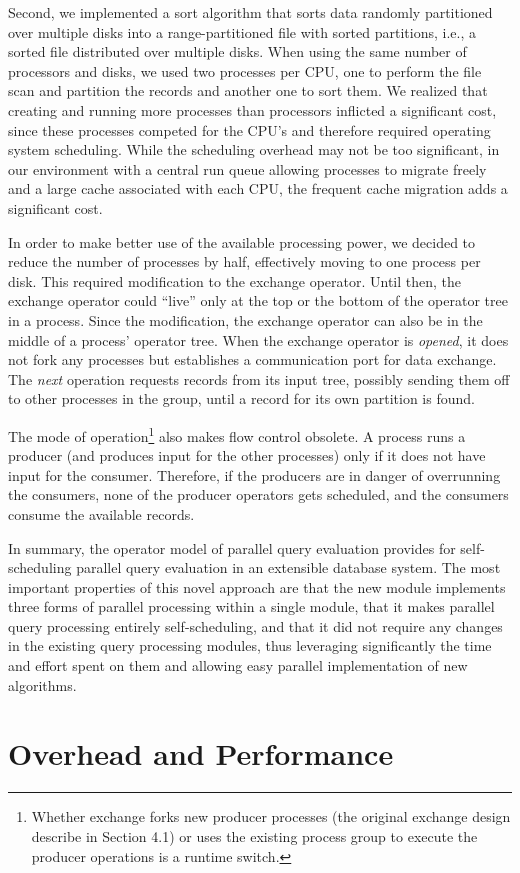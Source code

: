 \documentclass[a4paper,11pt,notitlepage,twoside,openright]{article}
\begin{document}
Second, we implemented a sort algorithm that sorts
data randomly partitioned over multiple disks into a range-partitioned
file with sorted partitions, i.e., a sorted file distributed
over multiple disks. When using the same number
of processors and disks, we used two processes per CPU,
one to perform the file scan and partition the records and
another one to sort them. We realized that creating and
running more processes than processors inflicted a significant
cost, since these processes competed for the CPU's and
therefore required operating system scheduling. While the
scheduling overhead may not be too significant, in our
environment with a central run queue allowing processes to
migrate freely and a large cache associated with each CPU,
the frequent cache migration adds a significant cost.

In order to make better use of the available processing
power, we decided to reduce the number of processes
by half, effectively moving to one process per disk. This
required modification to the exchange operator. Until then,
the exchange operator could ``live'' only at the top or the
bottom of the operator tree in a process. Since the modification,
the exchange operator can also be in the middle of
a process' operator tree. When the exchange operator is
\emph{opened}, it does not fork any processes but establishes a
communication port for data exchange. The \emph{next} operation
requests records from its input tree, possibly sending them
off to other processes in the group, until a record for its
own partition is found.

The mode of operation\footnote{%
Whether exchange forks new producer processes (the original
exchange design describe in Section 4.1) or uses the existing
process group to execute the producer operations is a runtime
switch.%
} also makes flow control
obsolete. A process runs a producer (and produces input
for the other processes) only if it does not have input for
the consumer. Therefore, if the producers are in danger of
overrunning the consumers, none of the producer operators
gets scheduled, and the consumers consume the available
records.

In summary, the operator model of parallel query
evaluation provides for self-scheduling parallel query evaluation
in an extensible database system. The most important
properties of this novel approach are that the new module
implements three forms of parallel processing within a single
module, that it makes parallel query processing entirely
self-scheduling, and that it did not require any changes in
the existing query processing modules, thus leveraging significantly
the time and effort spent on them and allowing
easy parallel implementation of new algorithms.

\section{Overhead and Performance}
\end{document}
